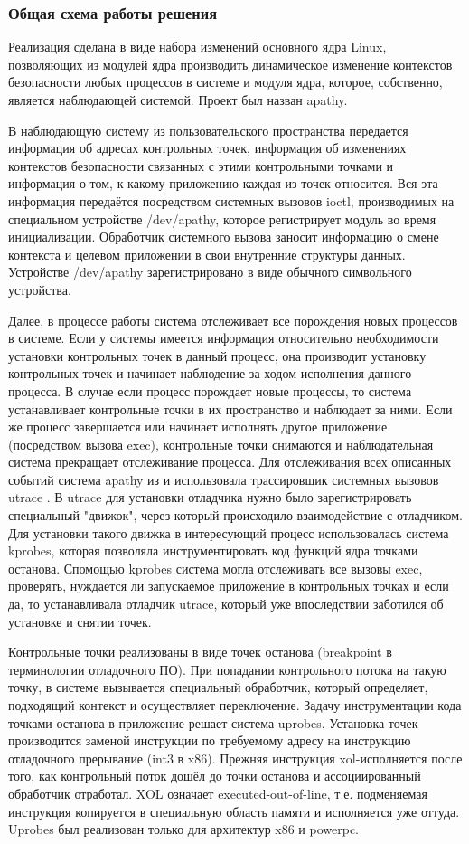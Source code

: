 \subsubsection{Общая схема работы решения}

Реализация сделана в виде набора изменений основного ядра Linux,
позволяющих из модулей ядра производить динамическое изменение
контекстов безопасности любых процессов в системе и модуля ядра,
которое, собственно, является наблюдающей системой. Проект был назван
apathy.

В наблюдающую систему из пользовательского пространства передается
информация об адресах контрольных точек, информация об изменениях
контекстов безопасности связанных с этими контрольными точками и
информация о том, к какому приложению каждая из точек относится. Вся эта
информация передаётся посредством системных вызовов ioctl, производимых
на специальном устройстве /dev/apathy, которое регистрирует модуль во
время инициализации. Обработчик системного вызова заносит информацию о
смене контекста и целевом приложении в свои внутренние структуры данных. 
Устройстве /dev/apathy зарегистрировано в виде обычного символьного
устройства.

Далее, в процессе работы система отслеживает все порождения новых
процессов в системе. Если у системы имеется информация относительно
необходимости установки контрольных точек в данный процесс, она
производит установку контрольных точек и начинает наблюдение за ходом
исполнения данного процесса. В случае если процесс порождает новые
процессы, то система устанавливает контрольные точки в их пространство и
наблюдает за ними. Если же процесс завершается или начинает исполнять
другое приложение (посредством вызова exec), контрольные точки снимаются
и наблюдательная система прекращает отслеживание процесса. Для
отслеживания всех описанных событий система apathy из \cite{bush} и
\cite{sacharov} использовала трассировщик системных вызовов utrace
\cite{utrace}. В utrace для установки отладчика нужно было
зарегистрировать специальный "движок", через который происходило
взаимодействие с отладчиком. Для установки такого движка в интересующий
процесс использовалась система kprobes, которая позволяла
инструментировать код функций ядра точками останова. Спомощью kprobes
система могла отслеживать все вызовы exec, проверять, нуждается ли
запускаемое приложение в контрольных точках и если да, то устанавливала
отладчик utrace, который уже впоследствии заботился об установке и
снятии точек.

Контрольные точки реализованы в виде точек останова (breakpoint в
терминологии отладочного ПО). При попадании контрольного потока на такую
точку, в системе вызывается специальный обработчик, который определяет,
подходящий контекст и осуществляет переключение. Задачу инструментации
кода точками останова в приложение решает система uprobes.  Установка
точек производится заменой инструкции по требуемому адресу на инструкцию
отладочного прерывание (int3 в x86). Прежняя инструкция xol-исполняется
после того, как контрольный поток дошёл до точки останова и
ассоциированный обработчик отработал. XOL означает executed-out-of-line,
т.е. подменяемая инструкция копируется в специальную область памяти и
исполняется уже оттуда. Uprobes был реализован только для архитектур x86
и powerpc.


